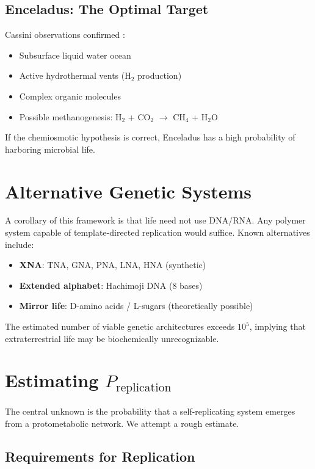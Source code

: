 \documentclass[11pt,twocolumn]{article}
\begin{document}
\subsection{Enceladus: The Optimal Target}

Cassini observations confirmed \citep{Waite2017}:
\begin{itemize}
\item Subsurface liquid water ocean
\item Active hydrothermal vents (H$_2$ production)
\item Complex organic molecules
\item Possible methanogenesis: H$_2$ + CO$_2$ $\rightarrow$ CH$_4$ + H$_2$O
\end{itemize}

If the chemiosmotic hypothesis is correct, Enceladus has a high probability of harboring microbial life.

\section{Alternative Genetic Systems}

A corollary of this framework is that life need not use DNA/RNA. Any polymer system capable of template-directed replication would suffice. Known alternatives include:

\begin{itemize}
\item \textbf{XNA}: TNA, GNA, PNA, LNA, HNA (synthetic)
\item \textbf{Extended alphabet}: Hachimoji DNA (8 bases) \citep{Hoshika2019}
\item \textbf{Mirror life}: D-amino acids / L-sugars (theoretically possible)
\end{itemize}

The estimated number of viable genetic architectures exceeds $10^5$, implying that extraterrestrial life may be biochemically unrecognizable.

\section{Estimating $P_{\text{replication}}$}

The central unknown is the probability that a self-replicating system emerges from a protometabolic network. We attempt a rough estimate.

\subsection{Requirements for Replication}
\end{document}
